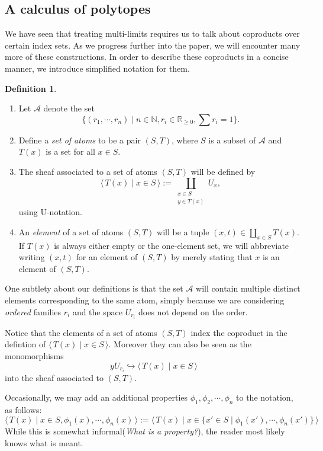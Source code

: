 \documentclass[a4paper]{amsproc}
\theoremstyle{plain}
\theoremstyle{definition}
\newtheorem{definition}[theorem]{Definition}
\theoremstyle{remark}
\numberwithin{equation}{section}
\newcommand{\y}{\textit{y}}
\newcommand{\la}{\langle\,}
\newcommand{\ra}{\,\rangle}
\begin{document}
\subsection{A calculus of polytopes}

We have seen that treating multi-limits requires us to talk about coproducts over certain index sets. As we progress further into the paper, we will encounter many more of these constructions. In order to describe these coproducts in a concise manner, we introduce simplified notation for them.

\begin{definition}
    \mbox{}
    \begin{enumerate}
        \item Let $\mathcal{A}$ denote the set
        \[
            \{(r_1,\cdots, r_n) \mid n \in \mathbb{N}, r_i \in \mathbb{R}_{\geq 0}, \sum r_i = 1\}.
        \]
        \item Define a \emph{set of atoms} to be a pair $(S, T)$, where $S$ is a subset of $\mathcal{A}$ and $T(x)$ is a set for all $x \in S$.
        \item The sheaf associated to a set of atoms $(S,T)$ will be defined by
        \[
            \la T(x) \mid x \in S \ra := \coprod_{\substack{x \in S \\ y \in T(x)}} U_x ,
        \]
        using U-notation.
        \item An \emph{element} of a set of atoms $(S,T)$ will be a tuple $(x,t) \in \coprod_{x \in S} T(x)$. If $T(x)$ is always either empty or the one-element set, we will abbreviate writing $(x,t)$ for an element of $(S,T)$ by merely stating that $x$ is an element of $(S,T)$.
    \end{enumerate}
\end{definition}

One subtlety about our definitions is that the set $\mathcal{A}$ will contain multiple distinct elements corresponding to the same atom, simply because we are considering \emph{ordered} families $r_i$ and the space $U_{r_i}$ does not depend on the order.

Notice that the elements of a set of atoms $(S,T)$ index the coproduct in the defintion of $\la T(x) \mid x \in S \ra$. Moreover they can also be seen as the monomorphisms
\[
    \y U_{r_i} \hookrightarrow \la T(x) \mid x \in S \ra
\]
into the sheaf associated to $(S,T)$.

Occasionally, we may add an additional properties $\phi_1, \phi_2, \cdots, \phi_n$ to the notation, as follows:
\[
    \la T(x) \mid x \in S, \phi_1(x), \cdots, \phi_n(x) \ra := \la T(x) \mid x \in \{x' \in S \mid \phi_1(x'), \cdots, \phi_n(x')\} \ra
\]
While this is somewhat informal(\emph{What is a property?}), the reader most likely knows what is meant.
\end{document}
